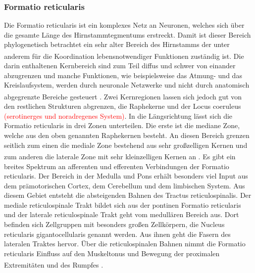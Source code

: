 \documentclass[12pt,a4paper,pdftex]{article}
\begin{document}
\subsubsection*{Formatio reticularis} 
Die Formatio reticularis ist ein komplexes Netz an Neuronen, welches sich über die gesamte Länge des Hirnstammtegmentums erstreckt. Damit ist dieser Bereich phylogenetisch betrachtet ein sehr alter Bereich des Hirnstamms der unter anderem für die Koordination lebensnotwendiger Funktionen zuständig ist\textsuperscript{\cite[6]{trepel2011neuroanatomie}}. Die darin enthaltenen Kernbereich sind zum Teil diffus und schwer von einander abzugrenzen und manche Funktionen, wie beispielsweise das Atmung- und das Kreislaufsystem, werden durch neuronale Netzwerke und nicht durch anatomisch abgegrenzte Bereiche gesteuert \textsuperscript{\cite[9]{crossman2014neuroanatomy}}. Zwei Kernregionen lassen sich jedoch gut von den restlichen Strukturen abgrenzen, die Raphekerne und der Locus coeruleus \textcolor{red}{(serotinerges und noradregenes System)}. In die Längsrichtung lässt sich die Formatio reticularis in drei Zonen unterteilen. Die erste ist die mediane Zone, welche aus den oben genannten Raphekernen besteht. An diesen Bereich grenzen seitlich zum einen die mediale Zone bestehend aus sehr großzelligen Kernen und zum anderen die laterale Zone mit sehr kleinzelligen Kernen an \textsuperscript{\cite[6]{trepel2011neuroanatomie}}. Es gibt ein breites Spektrum an afferenten und efferenten Verbindungen der Formatio reticularis. Der Bereich in der Medulla und Pons erhält besonders viel Input aus dem prämotorischen Cortex, dem Cerebellum und dem limbischen System. Aus diesem Gebiet entsteht die absteigenden Bahnen des Tractus reticulospinalis. Der mediale reticulospinale Trakt bildet sich aus der pontinen Formatio reticularis und der laterale reticulospinale Trakt geht vom medullären Bereich aus. Dort befinden sich Zellgruppen mit besonders großen Zellkörpern, die Nucleus reticularis gigantocellularis genannt werden. Aus ihnen geht die Fasern des lateralen Traktes hervor. Über die reticulospinalen Bahnen nimmt die Formatio reticularis Einfluss auf den Muskeltonus und Bewegung der proximalen Extremitäten und des Rumpfes \textsuperscript{\cite[9]{crossman2014neuroanatomy}}.
\end{document}
